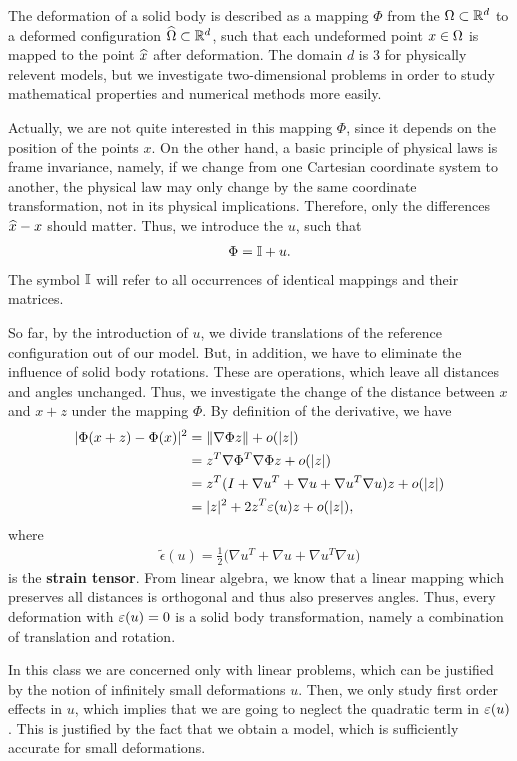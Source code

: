 \begin{intro}
  The deformation of a solid body is described as a mapping $\Phi$
  from the  $\Omega\subset \mathbb R^d$ to a
  deformed configuration $\widehat{\Omega} \subset \mathbb R^d$, such that
  each undeformed point $x\in\Omega$ is mapped to the point
  $\widehat{x}$ after deformation. The domain $d$ is 3 for physically
  relevent models, but we investigate two-dimensional problems in
  order to study mathematical properties and numerical methods more
  easily.

  Actually, we are not quite interested in this mapping $\Phi$, since
  it depends on the position of the points $x$. On the other hand, a
  basic principle of physical laws is frame invariance, namely, if we
  change from one Cartesian coordinate system to another, the physical
  law may only change by the same coordinate transformation, not in
  its physical implications. Therefore, only the differences
  $\widehat{x}-x$ should matter. Thus, we introduce the
   $u$, such that
  \begin{gather*}
    \Phi = \mathbb I + u.
  \end{gather*}
  The symbol $\mathbb I$ will refer to all occurrences of identical mappings
  and their matrices.

  So far, by the introduction of $u$, we divide translations of the
  reference configuration out of our model. But, in addition, we have
  to eliminate the influence of solid body rotations. These are
  operations, which leave all distances and angles unchanged. Thus, we
  investigate the change of the distance between $x$ and $x+z$ under
  the mapping $\Phi$. By definition of the derivative, we have
  \begin{align*}
    \lvert\Phi(x+z) - \Phi(x)\rvert^2 &= \lVert\nabla\Phi z\rVert + o(\lvert z\rvert)
    \\
                              &= z^T\nabla\Phi^T\nabla\Phi z + o(\lvert z\rvert)
    \\
    &= z^T(I + \nabla u^T + \nabla u + \nabla u^T \nabla u) z + o(\lvert z\rvert)
    \\
    &= \lvert z\rvert^2 + 2 z^T\varepsilon(u) z + o(\lvert z\rvert),
  \end{align*}
  where
  \begin{gather}
    \tilde\epsilon(u) = \tfrac12
    \bigl(\nabla u^T + \nabla u + \nabla u^T \nabla u\bigr)
  \end{gather}
  is the \textbf{strain tensor}. From linear algebra, we know that a
  linear mapping which preserves all distances is orthogonal and thus
  also preserves angles. Thus, every deformation with $\varepsilon(u)=0$
  is a solid body transformation, namely a combination of translation
  and rotation.

  In this class we are concerned only with linear problems, which can
  be justified by the notion of infinitely small deformations
  $u$. Then, we only study first order effects in $u$, which implies
  that we are going to neglect the quadratic term in
  $\varepsilon(u)$. This is justified by the fact that we obtain a model,
  which is sufficiently accurate for small deformations.
\end{intro}

